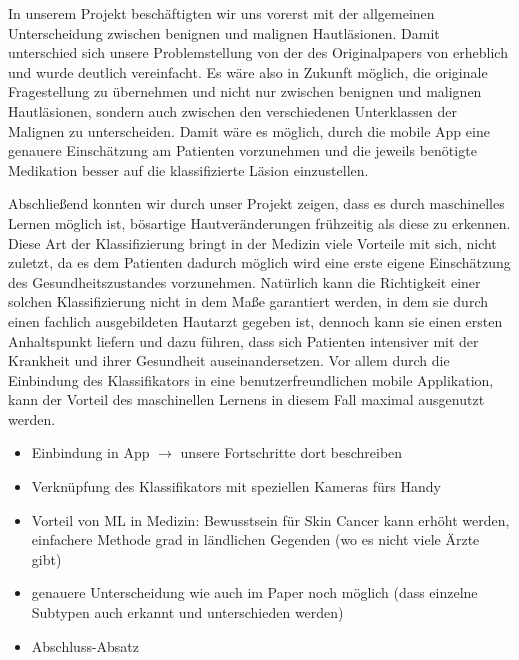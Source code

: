 In unserem Projekt beschäftigten wir uns vorerst mit der allgemeinen Unterscheidung zwischen benignen und malignen Hautläsionen. Damit unterschied sich unsere Problemstellung von der des Originalpapers von \citet{esteva2017dermatologist} erheblich und wurde deutlich vereinfacht. Es wäre also in Zukunft möglich, die originale Fragestellung zu übernehmen und nicht nur zwischen benignen und malignen Hautläsionen, sondern auch zwischen den verschiedenen Unterklassen der Malignen zu unterscheiden. Damit wäre es möglich, durch die mobile App eine genauere Einschätzung am Patienten vorzunehmen und die jeweils benötigte Medikation besser auf die klassifizierte Läsion einzustellen.\newline

Abschließend konnten wir durch unser Projekt zeigen, dass es durch maschinelles Lernen möglich ist, bösartige Hautveränderungen frühzeitig als diese zu erkennen. Diese Art der Klassifizierung bringt in der Medizin viele Vorteile mit sich, nicht zuletzt, da es dem Patienten dadurch möglich wird eine erste eigene Einschätzung des Gesundheitszustandes vorzunehmen. Natürlich kann die Richtigkeit einer solchen Klassifizierung nicht in dem Maße garantiert werden, in dem sie durch einen fachlich ausgebildeten Hautarzt gegeben ist, dennoch kann sie einen ersten Anhaltspunkt liefern und dazu führen, dass sich Patienten intensiver mit der Krankheit und ihrer Gesundheit auseinandersetzen. Vor allem durch die Einbindung des Klassifikators in eine benutzerfreundlichen mobile Applikation, kann der Vorteil des maschinellen Lernens in diesem Fall maximal ausgenutzt werden.  
 

\color{red}
\begin{itemize}
	\item[\checkmark] Einbindung in App $\rightarrow$ unsere Fortschritte dort beschreiben
	\item[\checkmark] Verknüpfung des Klassifikators mit speziellen Kameras fürs Handy
	\item[\checkmark] Vorteil von ML in Medizin: Bewusstsein für Skin Cancer kann erhöht werden, einfachere Methode grad in ländlichen Gegenden (wo es nicht viele Ärzte gibt)
	\item[\checkmark] genauere Unterscheidung wie auch im Paper noch möglich (dass einzelne Subtypen auch erkannt und unterschieden werden)
	\item[\checkmark] Abschluss-Absatz

\end{itemize}
\color{black}